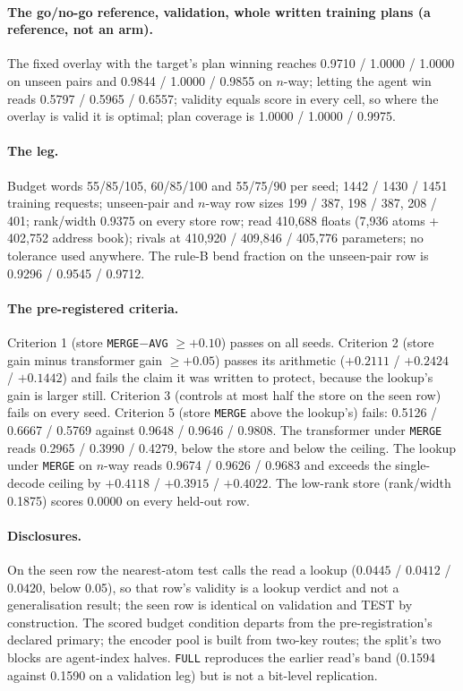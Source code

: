 \documentclass{article} %
\begin{document}
\paragraph{The go/no-go reference, validation, whole written training plans (a reference, not an
arm).} The fixed overlay with the target's plan winning reaches 0.9710 / 1.0000 / 1.0000 on unseen
pairs and 0.9844 / 1.0000 / 0.9855 on $n$-way; letting the agent win reads 0.5797 / 0.5965 / 0.6557;
validity equals score in every cell, so where the overlay is valid it is optimal; plan coverage is
1.0000 / 1.0000 / 0.9975. %

\paragraph{The leg.} Budget words 55/85/105, 60/85/100 and 55/75/90 per seed; 1442 / 1430 / 1451
training requests; unseen-pair and $n$-way row sizes 199 / 387, 198 / 387, 208 / 401; rank/width
0.9375 on every store row; read 410,688 floats (7,936 atoms + 402,752 address book); rivals at
410,920 / 409,846 / 405,776 parameters; no tolerance used anywhere. The rule-B bend fraction on the
unseen-pair row is 0.9296 / 0.9545 / 0.9712. %

\paragraph{The pre-registered criteria.} Criterion 1 (store \texttt{MERGE}$-$\texttt{AVG} $\ge+0.10$) passes on all seeds.
Criterion 2 (store gain minus transformer gain $\ge+0.05$) passes its arithmetic ($+0.2111$ / $+0.2424$
/ $+0.1442$) and fails the claim it was written to protect, because the lookup's gain is larger
still. Criterion 3 (controls at most half the store on the seen row) fails on every seed. Criterion 5 (store
\texttt{MERGE} above the lookup's) fails: 0.5126 / 0.6667 / 0.5769 against 0.9648 / 0.9646 /
0.9808. The transformer under \texttt{MERGE} reads 0.2965 / 0.3990 / 0.4279, below the store and
below the ceiling. The lookup under \texttt{MERGE} on $n$-way reads 0.9674 / 0.9626 / 0.9683 and
exceeds the single-decode ceiling by $+0.4118$ / $+0.3915$ / $+0.4022$. The low-rank store
(rank/width 0.1875) scores 0.0000 on every held-out row. %

\paragraph{Disclosures.} On the seen row the nearest-atom test calls the read a lookup
($0.0445$ / $0.0412$ / $0.0420$, below 0.05), so that row's validity is a lookup verdict and not a
generalisation result; the seen row is identical on validation and TEST by construction. The
scored budget condition departs from the pre-registration's declared primary; the encoder pool is built
from two-key routes; the split's two blocks are agent-index halves. \texttt{FULL} reproduces the
earlier read's band (0.1594 against 0.1590 on a validation leg) but is not a bit-level
replication. %
\end{document}
